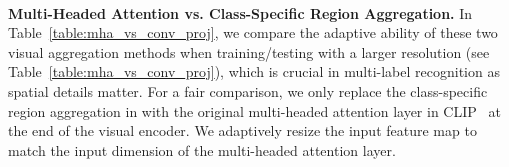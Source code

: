\begin{table}
    \begin{center}
     \caption{\small \textbf{Comparison between multi-headed attention and class-specific feature aggregation on MS-COCO} }~\label{table:mha_vs_conv_proj}
    \end{center}
\vspace{-10pt}
\end{table} \textbf{Multi-Headed Attention vs. Class-Specific Region Aggregation.} 
In Table~\ref{table:mha_vs_conv_proj}, we compare the adaptive ability of these two visual aggregation methods when training/testing with a larger resolution (see Table~\ref{table:mha_vs_conv_proj}), which is crucial in multi-label recognition as spatial details matter. For a fair comparison, we only replace the class-specific region aggregation in \ours with the original multi-headed attention layer in CLIP~\cite{radford2019language} at the end of the visual encoder. We adaptively resize the input feature map to match the input dimension of the multi-headed attention layer.  

